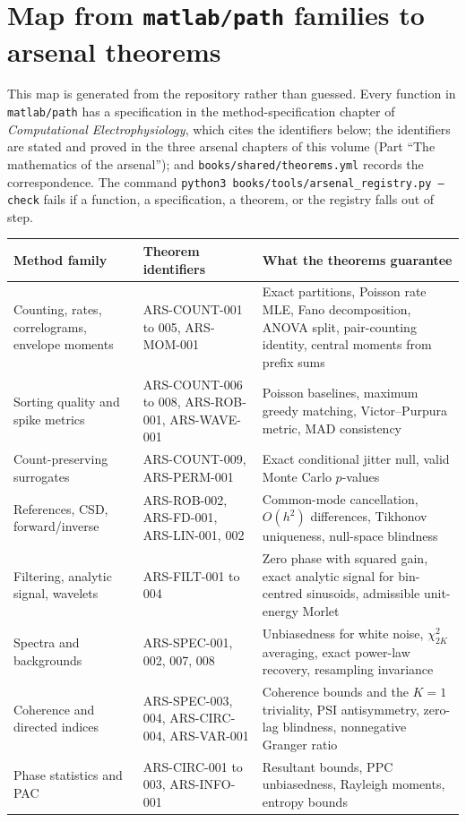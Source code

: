 \chapter{Map from \texttt{matlab/path} families to arsenal theorems}\label{app:arsenal}
This map is generated from the repository rather than guessed. Every function in \texttt{matlab/path} has a specification in the method-specification chapter of \emph{Computational Electrophysiology}, which cites the identifiers below; the identifiers are stated and proved in the three arsenal chapters of this volume (Part ``The mathematics of the arsenal''); and \texttt{books/shared/theorems.yml} records the correspondence. The command \texttt{python3 books/tools/arsenal\_registry.py --check} fails if a function, a specification, a theorem, or the registry falls out of step.
\begin{longtable}{p{}p{}p{}}\toprule
Method family & Theorem identifiers & What the theorems guarantee\\\midrule\endhead
Counting, rates, correlograms, envelope moments & ARS-COUNT-001 to 005, ARS-MOM-001 & Exact partitions, Poisson rate MLE, Fano decomposition, ANOVA split, pair-counting identity, central moments from prefix sums\\
Sorting quality and spike metrics & ARS-COUNT-006 to 008, ARS-ROB-001, ARS-WAVE-001 & Poisson baselines, maximum greedy matching, Victor--Purpura metric, MAD consistency\\
Count-preserving surrogates & ARS-COUNT-009, ARS-PERM-001 & Exact conditional jitter null, valid Monte Carlo $p$-values\\
References, CSD, forward/inverse & ARS-ROB-002, ARS-FD-001, ARS-LIN-001, 002 & Common-mode cancellation, $O(h^2)$ differences, Tikhonov uniqueness, null-space blindness\\
Filtering, analytic signal, wavelets & ARS-FILT-001 to 004 & Zero phase with squared gain, exact analytic signal for bin-centred sinusoids, admissible unit-energy Morlet\\
Spectra and backgrounds & ARS-SPEC-001, 002, 007, 008 & Unbiasedness for white noise, $\chi^2_{2K}$ averaging, exact power-law recovery, resampling invariance\\
Coherence and directed indices & ARS-SPEC-003, 004, ARS-CIRC-004, ARS-VAR-001 & Coherence bounds and the $K=1$ triviality, PSI antisymmetry, zero-lag blindness, nonnegative Granger ratio\\
Phase statistics and PAC & ARS-CIRC-001 to 003, ARS-INFO-001 & Resultant bounds, PPC unbiasedness, Rayleigh moments, entropy bounds\\

\end{longtable}
